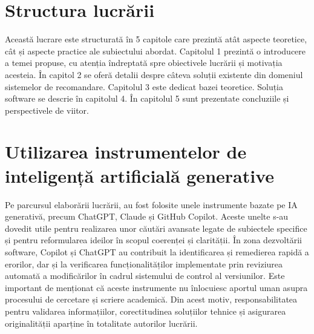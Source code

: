 \section{Structura lucrării}
\label{section:ch1sec3}

Această lucrare este structurată în 5 capitole care prezintă atât aspecte teoretice, cât și aspecte practice ale subiectului abordat. 
Capitolul 1 prezintă o introducere a temei propuse, cu atenția îndreptată spre obiectivele lucrării și motivația acesteia. 
În capitol 2 se oferă detalii despre câteva soluții existente din domeniul sistemelor de recomandare.
Capitolul 3 este dedicat bazei teoretice.
Soluția software se descrie în capitolul 4. 
În capitolul 5 sunt prezentate concluziile și perspectivele de viitor.

\section{Utilizarea instrumentelor de inteligență artificială generative}
\label{section:ch1sec4}
Pe parcursul elaborării lucrării, au fost folosite unele instrumente bazate pe IA generativă, precum ChatGPT, Claude și GitHub Copilot.
Aceste unelte s-au dovedit utile pentru realizarea unor căutări avansate legate de subiectele specifice și pentru reformularea ideilor în scopul coerenței și clarității.
În zona dezvoltării software, Copilot și ChatGPT au contribuit la identificarea și remedierea rapidă a erorilor, dar și la verificarea funcționalităților implementate prin reviziurea automată a modificărilor în cadrul sistemului de control al versiunilor.
Este important de menționat că aceste instrumente nu înlocuiesc aportul uman asupra procesului de cercetare și scriere academică.
Din acest motiv, responsabilitatea pentru validarea informațiilor, corectitudinea soluțiilor tehnice și asigurarea originalității aparține în totalitate autorilor lucrării.